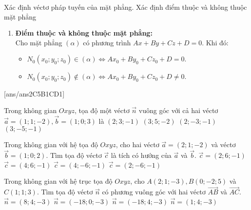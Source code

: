 \begin{dang}{Xác định véctơ pháp tuyến của mặt phẳng. Xác định điểm thuộc và không thuộc mặt phẳng}
\begin{enumerate}[label=\bf\arabic*.]
\begin{itemize}
	\end{itemize}
		\item \textbf{Điểm thuộc và không thuộc mặt phẳng:}\\
		Cho mặt phẳng $(\alpha)$ có phương trình $A x+B y+C z+D=0$. Khi đó: 
		\begin{itemize}
		\item $N_0\left(x_0; y_0; z_0\right) \in(\alpha) \Leftrightarrow A x_0+B y_0+C z_0+D=0$.
		\item $N_0\left(x_0; y_0; z_0\right) \notin(\alpha) \Leftrightarrow A x_0+B y_0+C z_0+D \neq 0$.	
		\end{itemize}
	\end{enumerate}
\end{dang}

\TN
{}[ans/ans2C5B1CD1]
\begin{ex}%
	Trong không gian $O x y z$, tọa độ một véctơ $\overrightarrow{n}$ vuông góc với cả hai véctơ $\overrightarrow{a}=(1; 1;-2), \overrightarrow{b}=(1; 0; 3)$ là
	\choice
	{$(2; 3;-1)$}
	{$(3; 5;-2)$}
	{$(2;-3;-1)$}
	{\True $(3;-5;-1)$}
\end{ex}

\begin{ex}%
	Trong không gian với hệ tọa độ $O x y z$, cho hai véctơ $\overrightarrow{a}=(2; 1;-2)$ và véctơ $\overrightarrow{b}=(1; 0; 2)$. Tìm tọa độ véctơ $\overrightarrow{c}$ là tích có hướng của $\overrightarrow{a}$ và $\overrightarrow{b}$.
	\choice
	{$\overrightarrow{c}=(2; 6;-1)$}
	{$\overrightarrow{c}=(4; 6;-1)$}
	{$\overrightarrow{c}=(4;-6;-1)$}
	{\True $\overrightarrow{c}=(2;-6;-1)$}
\end{ex}

\begin{ex}%
	Trong không gian với hệ trục tọa độ $O x y z$, cho $A(2; 1;-3), B(0;-2; 5)$ và $C(1; 1; 3)$. Tìm tọa độ véctơ $\overrightarrow{n}$ có phương vuông góc với hai véctơ $\overrightarrow{A B}$ và $\overrightarrow{A C}$.
	\choice
	{$\overrightarrow{n}=(8; 4;-3)$}
	{$\overrightarrow{n}=(-18; 0;-3)$}
	{\True $\overrightarrow{n}=(-18; 4;-3)$}
	{$\overrightarrow{n}=(1; 4;-3)$}
\end{ex}

